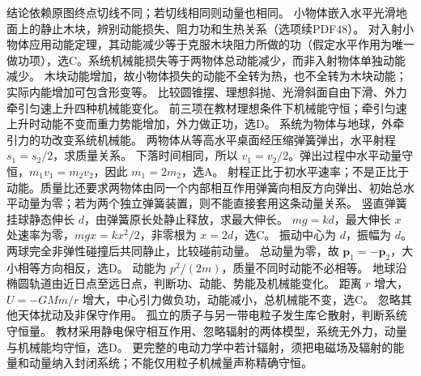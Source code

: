 \crosscheck 结论依赖原图终点切线不同；若切线相同则动量也相同。
\problemtext 小物体嵌入水平光滑地面上的静止木块，辨别动能损失、阻力功和生热关系（选项续PDF48）。
\workings 对入射小物体应用动能定理，其动能减少等于克服木块阻力所做的功（假定水平作用为唯一做功项），选C。系统机械能损失等于两物体总动能减少，而非入射物体单独动能减少。
\crosscheck 木块动能增加，故小物体损失的动能不全转为热，也不全转为木块动能；实际内能增加可包含形变等。
\problemtext 比较圆锥摆、理想斜抛、光滑斜面自由下滑、外力牵引匀速上升四种机械能变化。
\workings 前三项在教材理想条件下机械能守恒；牵引匀速上升时动能不变而重力势能增加，外力做正功，选D。
\crosscheck 系统为物体与地球，外牵引力的功改变系统机械能。
\problemtext 两物体从等高水平桌面经压缩弹簧弹出，水平射程 $s_1=s_2/2$，求质量关系。
\workings 下落时间相同，所以 $v_1=v_2/2$。弹出过程中水平动量守恒，$m_1v_1=m_2v_2$，因此 $m_1=2m_2$，选A。
\crosscheck 射程正比于初水平速率；不是正比于动能。质量比还要求两物体由同一个内部相互作用弹簧向相反方向弹出、初始总水平动量为零；若为两个独立弹簧装置，则不能直接套用这条动量关系。
\problemtext 竖直弹簧挂球静态伸长 $d$，由弹簧原长处静止释放，求最大伸长。
\workings $mg=kd$，最大伸长 $x$ 处速率为零，$mgx=kx^2/2$，非零根为 $x=2d$，选C。
\crosscheck 振动中心为 $d$，振幅为 $d$。
\problemtext 两球完全非弹性碰撞后共同静止，比较碰前动量。
\workings 总动量为零，故 $\bm p_1=-\bm p_2$，大小相等方向相反，选D。
\crosscheck 动能为 $p^2/(2m)$，质量不同时动能不必相等。
\problemtext 地球沿椭圆轨道由近日点至远日点，判断功、动能、势能及机械能变化。
\workings 距离 $r$ 增大，$U=-GMm/r$ 增大，中心引力做负功，动能减小，总机械能不变，选C。
\crosscheck 忽略其他天体扰动及非保守作用。
\problemtext 孤立的质子与另一带电粒子发生库仑散射，判断系统守恒量。
\workings 教材采用静电保守相互作用、忽略辐射的两体模型，系统无外力，动量与机械能均守恒，选D。
\crosscheck 更完整的电动力学中若计辐射，须把电磁场及辐射的能量和动量纳入封闭系统；不能仅用粒子机械量声称精确守恒。

